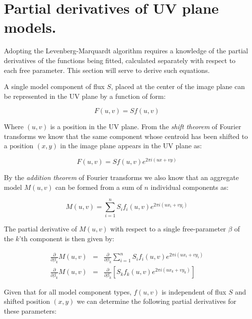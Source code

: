 \documentclass[11pt]{article}
\begin{document}
\section{Partial derivatives of UV plane models.}

Adopting the Levenberg-Marquardt algorithm requires a knowledge of the
partial derivatives of the functions being fitted, calculated
separately with respect to each free parameter. This section will
serve to derive such equations.

A single model component of flux $S$, placed at the center of the
image plane can be represented in the UV plane by a function of form:

\begin{equation}
F(u,v) = S f(u,v)
\end{equation}

Where $(u,v)$ is a position in the UV plane. From the {\em shift
theorem} of Fourier transforms we know that the same component whose
centroid has been shifted to a position $(x,y)$ in the image plane
appears in the UV plane as:

\begin{equation}
F(u,v) = S f(u,v) e^{2 \pi i (u x + v y)}
\end{equation}

By the {\em addition theorem} of Fourier transforms we also know that
an aggregate model $M(u,v)$ can be formed from a sum of $n$ individual
components as:

\begin{equation}
M(u,v) = \sum^{n}_{i=1} S_{i} f_{i}(u,v) e^{2 \pi i (u x_{i} + v y_{i})}
\end{equation}

The partial derivative of $M(u,v)$ with respect to a single
free-parameter $\beta$ of the $k$'th component is then given by:

\begin{eqnarray}
\frac{\partial}{\partial \beta_{k}} M(u,v) & = & \frac{\partial}{\partial \beta_{k}} \sum^{n}_{i=1} S_{i} f_{i}(u,v) e^{2 \pi i (u x_{i} + v y_{i})}\\
%
\label{cmp_deriv}
\frac{\partial}{\partial \beta_{k}} M(u,v) & = & \frac{\partial}{\partial \beta_{k}} [S_{k} f_{k}(u,v) e^{2 \pi i (u x_{k} + v y_{k})}]
\end{eqnarray}

Given that for all model component types, $f(u,v)$ is independent of
flux $S$ and shifted position $(x,y)$ we can determine the following
partial derivatives for these parameters:
\end{document}
